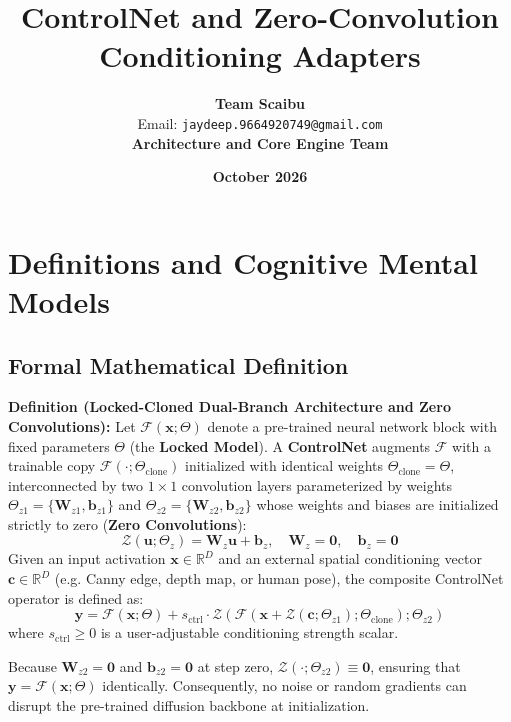 \documentclass[11pt,a4paper]{article}
\title{\textbf{ControlNet and Zero-Convolution Conditioning Adapters}}
\author{\textbf{Team Scaibu} \\ \small Email: \texttt{jaydeep.9664920749@gmail.com} \\ \small \textbf{Architecture and Core Engine Team}}
\date{\textbf{October 2026}}
\theoremstyle{definition}
\begin{document}
\maketitle

\section{Definitions and Cognitive Mental Models}

\subsection{Formal Mathematical Definition}
\textbf{Definition (Locked-Cloned Dual-Branch Architecture and Zero Convolutions):}
Let $\mathcal{F}(\mathbf{x}; \Theta)$ denote a pre-trained neural network block with fixed parameters $\Theta$ (the \textbf{Locked Model}). A \textbf{ControlNet} augments $\mathcal{F}$ with a trainable copy $\mathcal{F}(\cdot; \Theta_{\text{clone}})$ initialized with identical weights $\Theta_{\text{clone}} = \Theta$, interconnected by two $1 \times 1$ convolution layers parameterized by weights $\Theta_{z1} = \{\mathbf{W}_{z1}, \mathbf{b}_{z1}\}$ and $\Theta_{z2} = \{\mathbf{W}_{z2}, \mathbf{b}_{z2}\}$ whose weights and biases are initialized strictly to zero (\textbf{Zero Convolutions}):
{\boldmath
\begin{equation}
\mathcal{Z}(\mathbf{u}; \Theta_z) = \mathbf{W}_z \mathbf{u} + \mathbf{b}_z, \quad \mathbf{W}_z = \mathbf{0}, \quad \mathbf{b}_z = \mathbf{0}
\end{equation}
}
Given an input activation $\mathbf{x} \in \mathbb{R}^D$ and an external spatial conditioning vector $\mathbf{c} \in \mathbb{R}^D$ (e.g. Canny edge, depth map, or human pose), the composite ControlNet operator is defined as:
{\boldmath
\begin{equation}
\mathbf{y} = \mathcal{F}(\mathbf{x}; \Theta) + s_{\text{ctrl}} \cdot \mathcal{Z}\left( \mathcal{F}\left( \mathbf{x} + \mathcal{Z}(\mathbf{c}; \Theta_{z1}); \Theta_{\text{clone}} \right); \Theta_{z2} \right)
\end{equation}
}
where $s_{\text{ctrl}} \ge 0$ is a user-adjustable conditioning strength scalar.

Because $\mathbf{W}_{z2} = \mathbf{0}$ and $\mathbf{b}_{z2} = \mathbf{0}$ at step zero, $\mathcal{Z}(\cdot; \Theta_{z2}) \equiv \mathbf{0}$, ensuring that $\mathbf{y} = \mathcal{F}(\mathbf{x}; \Theta)$ identically. Consequently, no noise or random gradients can disrupt the pre-trained diffusion backbone at initialization.
\end{document}
